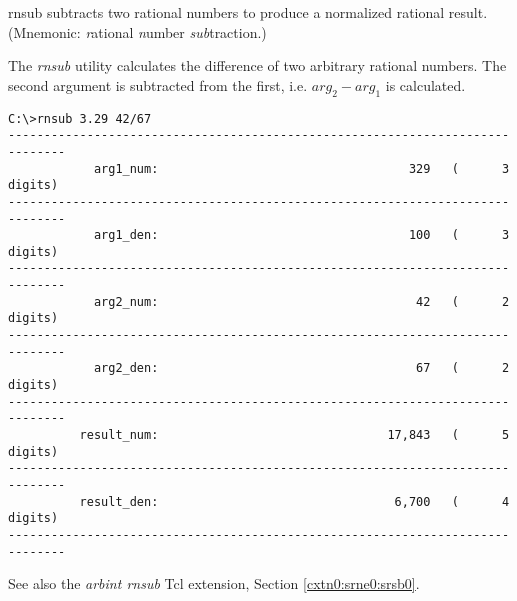 \begin{dosutilcommandname}{rnsub}%
subtracts two rational numbers to produce a normalized rational result.  
(Mnemonic:  \emph{r}ational \emph{n}umber
\emph{sub}traction.)
\end{dosutilcommandname}

\begin{dosutilcommandsynopsis}
\end{dosutilcommandsynopsis}

\begin{dosutilcommanddescription}
The \emph{rnsub} utility calculates the difference of two arbitrary
rational numbers.  The second argument is subtracted from the first,
i.e. $arg_2 - arg_1$ is calculated.
\end{dosutilcommanddescription}

\begin{dosutilcommandsampleinvocations}
\begin{scriptsize}
\begin{verbatim}
C:\>rnsub 3.29 42/67
------------------------------------------------------------------------------
            arg1_num:                                   329   (      3 digits)
------------------------------------------------------------------------------
            arg1_den:                                   100   (      3 digits)
------------------------------------------------------------------------------
            arg2_num:                                    42   (      2 digits)
------------------------------------------------------------------------------
            arg2_den:                                    67   (      2 digits)
------------------------------------------------------------------------------
          result_num:                                17,843   (      5 digits)
------------------------------------------------------------------------------
          result_den:                                 6,700   (      4 digits)
------------------------------------------------------------------------------
\end{verbatim}
\end{scriptsize}
\end{dosutilcommandsampleinvocations}

\begin{dosutilcommandseealso}
See also the \emph{arbint rnsub} Tcl extension, 
Section \ref{cxtn0:srne0:srsb0}.
\end{dosutilcommandseealso}


